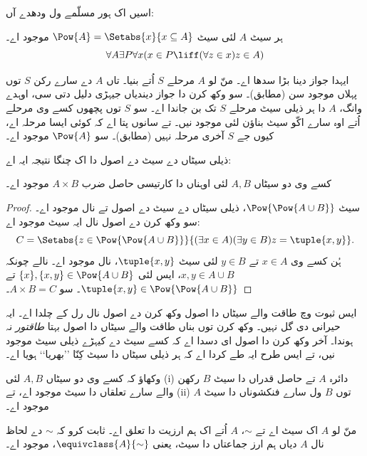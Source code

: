 \documentclass[../../../include/open-logic-section]{subfiles}
\begin{document}

اسیں اک ہور مسلّمے ول ودھدے آں:

\begin{axiom}
ہر سیٹ $A$ لئی سیٹ $\Pow{A} = \Setabs{x}{x \subseteq A}$ موجود اے۔
\[
	\forall A \exists P \forall x(x \in P \liff (\forall z \in x)z \in A)
\]
\end{axiom}

ایہدا جواز دینا بڑا سدھا اے۔ منّ لو $A$ مرحلے $S$ اُتے بنیا۔
تاں $A$ دے سارے رکن $S$ توں پہلاں موجود سن (\stagesacc مطابق)۔
سو وکھ کرن دا جواز دیندیاں جیہڑی دلیل دتی سی، اوہدے وانگ، $A$ دا ہر
ذیلی سیٹ مرحلے $S$ تک بن جاندا اے۔ سو $S$ توں پچھوں کسے وی مرحلے اُتے
اوہ سارے اکّو سیٹ بناؤن لئی موجود نیں۔ تے سانوں پتا اے کہ کوئی ایسا
مرحلہ اے، کیوں جے $S$ آخری مرحلہ نہیں (\stagessucc مطابق)۔ سو $\Pow{A}$
موجود اے۔

ذیلی سیٹاں دے سیٹ دے اصول دا اک چنگا نتیجہ ایہ اے:

\begin{prop}\label{thm:Products}
کسے وی دو سیٹاں $A, B$ لئی اوہناں دا کارتیسی حاصل ضرب $A \times B$ موجود اے۔
\end{prop}

\begin{proof}
سیٹ $\Pow{\Pow{A \cup B}}$، ذیلی سیٹاں دے سیٹ دے اصول تے
 نال موجود اے۔ سو وکھ کرن
دے اصول نال ایہ سیٹ موجود اے:
\[
	C = \Setabs{z \in \Pow{\Pow{A \cup B}}}{(\exists x \in A)(\exists y \in B) z = \tuple{x, y}}.
\]
ہُن کسے وی $x \in A$ تے $y \in B$ لئی سیٹ $\tuple{x, y}$،
 نال موجود اے۔
نالے چونکہ $x, y \in A \cup B$، ایس لئی $\{x\}, \{x, y\} \in \Pow{A \cup B}$
تے $\tuple{x,y} \in \Pow{\Pow{A \cup B}}$۔ سو $A \times B = C$۔
\end{proof}

ایس ثبوت وچ طاقت والے سیٹاں دا اصول وکھ کرن دے اصول نال رل کے چلدا
اے۔ ایہ حیرانی دی گل نہیں۔ وکھ کرن توں بناں طاقت والے سیٹاں دا اصول
بہتا \emph{طاقتور} نہ ہوندا۔ آخر وکھ کرن دا اصول ای دسدا اے کہ کسے
سیٹ دے کیہڑے ذیلی سیٹ موجود نیں، تے ایس طرح ایہ طے کردا اے کہ ہر
ذیلی سیٹاں دا سیٹ کِنّا ’’بھریا‘‘ ہویا اے۔

\begin{prob}
وکھاؤ کہ کسے وی دو سیٹاں $A, B$ لئی (i) دائرہ $A$ تے حاصل قدراں دا
سیٹ $B$ رکھن والے سارے تعلقاں دا سیٹ موجود اے، تے (ii) $A$ توں $B$ ول
سارے فنکشوناں دا سیٹ موجود اے۔
\end{prob}

\begin{prob}
منّ لو $A$ اک سیٹ اے تے $\sim$، $A$ اُتے اک ہم ارزیت دا تعلق اے۔
ثابت کرو کہ $\sim$ دے لحاظ نال $A$ دیاں ہم ارز جماعتاں دا سیٹ،
یعنی $\equivclass{A}{\sim}$، موجود اے۔
\end{prob}
\end{document}
